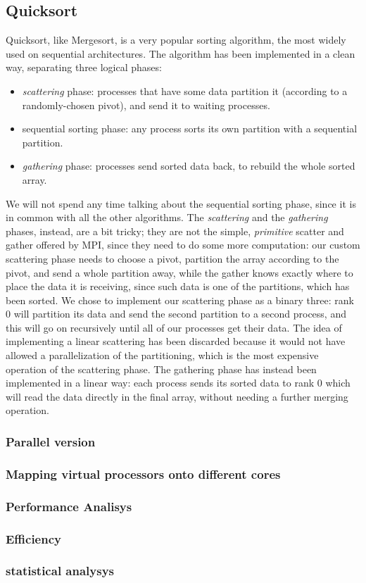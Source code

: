 \subsection{Quicksort}
Quicksort, like Mergesort, is a very popular sorting algorithm, the most widely used on sequential architectures. The algorithm has been implemented in a clean way, separating three logical phases:
\begin{itemize}
	\item{\textit{scattering} phase: processes that have some data partition it (according to a randomly-chosen pivot), and send it to waiting processes.}
	\item{sequential sorting phase: any process sorts its own partition with a sequential partition.}
	\item{\textit{gathering} phase: processes send sorted data back, to rebuild the whole sorted array.}
\end{itemize}
We will not spend any time talking about the sequential sorting phase, since it is in common with all the other algorithms.
The \textit{scattering} and the \textit{gathering} phases, instead, are a bit tricky; they are not the simple, \textit{primitive} scatter and gather offered by MPI, since they need to do some more computation: our custom scattering phase needs to choose a pivot, partition the array according to the pivot, and send a whole partition away, while the gather knows exactly where to place the data it is receiving, since such data is one of the partitions, which has been sorted.
We chose to implement our scattering phase as a binary three: rank 0 will partition its data and send the second partition to a second process, and this will go on recursively until all of our processes get their data. The idea of implementing a linear scattering has been discarded because it would not have allowed a parallelization of the partitioning, which is the most expensive operation of the scattering phase.
The gathering phase has instead been implemented in a linear way: each process sends its sorted data to rank 0 which will read the data directly in the final array, without needing a further merging operation.

\subsubsection*{Parallel version}
\subsubsection*{Mapping virtual processors onto different cores} 
\subsubsection*{Performance Analisys} 
\subsubsection*{Efficiency} 
\subsubsection*{statistical analysys}

